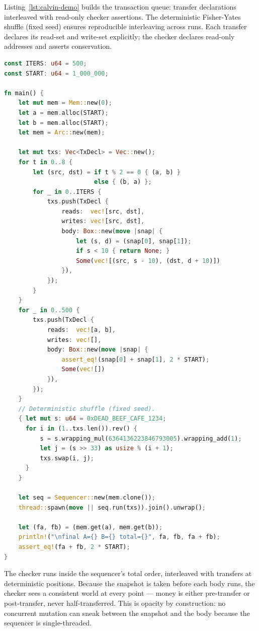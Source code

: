 Listing~\ref{lst:calvin-demo} builds the transaction queue: transfer declarations interleaved with read-only checker assertions. The deterministic Fisher-Yates shuffle (fixed seed) ensures reproducible interleaving across runs. Each transfer declares its read-set and write-set explicitly; the checker declares read-only addresses and asserts conservation.

\begin{lstlisting}[language=Rust, caption={Calvin bank demo: static transfer declarations, deterministic shuffle, conservation assertion mid-flight.}, label={lst:calvin-demo}]
const ITERS: u64 = 500;
const START: u64 = 1_000_000;

fn main() {
    let mut mem = Mem::new(0);
    let a = mem.alloc(START);
    let b = mem.alloc(START);
    let mem = Arc::new(mem);

    let mut txs: Vec<TxDecl> = Vec::new();
    for t in 0..8 {
        let (src, dst) = if t % 2 == 0 { (a, b) }
                         else { (b, a) };
        for _ in 0..ITERS {
            txs.push(TxDecl {
                reads:  vec![src, dst],
                writes: vec![src, dst],
                body: Box::new(move |snap| {
                    let (s, d) = (snap[0], snap[1]);
                    if s < 10 { return None; }
                    Some(vec![(src, s - 10), (dst, d + 10)])
                }),
            });
        }
    }
    for _ in 0..500 {
        txs.push(TxDecl {
            reads:  vec![a, b],
            writes: vec![],
            body: Box::new(move |snap| {
                assert_eq!(snap[0] + snap[1], 2 * START);
                Some(vec![])
            }),
        });
    }
    // Deterministic shuffle (fixed seed).
    { let mut s: u64 = 0xDEAD_BEEF_CAFE_1234;
      for i in (1..txs.len()).rev() {
          s = s.wrapping_mul(6364136223846793005).wrapping_add(1);
          let j = (s >> 33) as usize % (i + 1);
          txs.swap(i, j);
      }
    }

    let seq = Sequencer::new(mem.clone());
    thread::spawn(move || seq.run(txs)).join().unwrap();

    let (fa, fb) = (mem.get(a), mem.get(b));
    println!("\nfinal A={} B={} total={}", fa, fb, fa + fb);
    assert_eq!(fa + fb, 2 * START);
}
\end{lstlisting}

The checker runs inside the sequencer's total order, interleaved with transfers at deterministic positions. Because the snapshot is taken before each body runs, the checker sees a consistent world at every point --- money is either pre-transfer or post-transfer, never half-transferred. This is opacity by construction: no concurrent mutation can sneak between the snapshot and the body because the sequencer is single-threaded.


